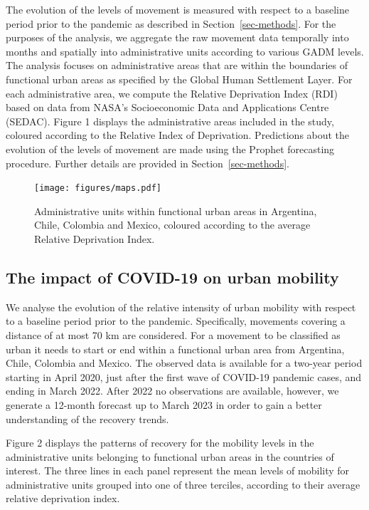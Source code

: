 \documentclass[
  11pt,
]{article}
\begin{document}
The evolution of the levels of movement is measured with respect to a
baseline period prior to the pandemic as described in
Section~\ref{sec-methods}. For the purposes of the analysis, we
aggregate the raw movement data temporally into months and spatially
into administrative units according to various GADM levels. The analysis
focuses on administrative areas that are within the boundaries of
functional urban areas as specified by the Global Human Settlement
Layer. For each administrative area, we compute the Relative Deprivation
Index (RDI) based on data from NASA's Socioeconomic Data and
Applications Centre (SEDAC). Figure 1 displays the administrative areas
included in the study, coloured according to the Relative Index of
Deprivation. Predictions about the evolution of the levels of movement
are made using the Prophet forecasting procedure. Further details are
provided in Section~\ref{sec-methods}.

\begin{figure}

{\centering \texttt{[image: figures/maps.pdf]}

}

\caption{Administrative units within functional urban areas in
Argentina, Chile, Colombia and Mexico, coloured according to the average
Relative Deprivation Index.}

\end{figure}

\hypertarget{the-impact-of-covid-19-on-urban-mobility}{%
\subsection{The impact of COVID-19 on urban
mobility}\label{the-impact-of-covid-19-on-urban-mobility}}

We analyse the evolution of the relative intensity of urban mobility
with respect to a baseline period prior to the pandemic. Specifically,
movements covering a distance of at most 70 km are considered. For a
movement to be classified as urban it needs to start or end within a
functional urban area from Argentina, Chile, Colombia and Mexico. The
observed data is available for a two-year period starting in April 2020,
just after the first wave of COVID-19 pandemic cases, and ending in
March 2022. After 2022 no observations are available, however, we
generate a 12-month forecast up to March 2023 in order to gain a better
understanding of the recovery trends.

Figure 2 displays the patterns of recovery for the mobility levels in
the administrative units belonging to functional urban areas in the
countries of interest. The three lines in each panel represent the mean
levels of mobility for administrative units grouped into one of three
terciles, according to their average relative deprivation index.
\end{document}
